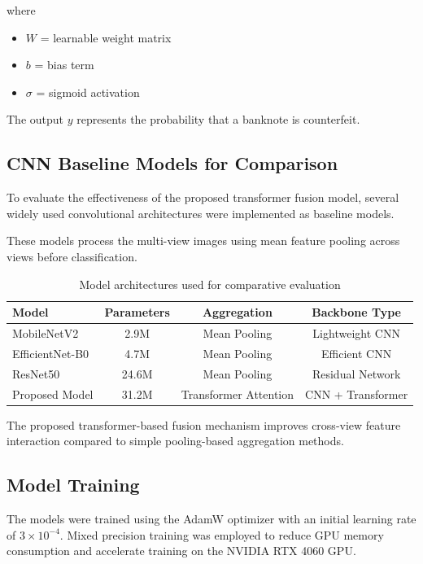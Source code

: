\documentclass[preprint,12pt,authoryear]{elsarticle}
\begin{document}
where

\begin{itemize}
\item $W$ = learnable weight matrix
\item $b$ = bias term
\item $\sigma$ = sigmoid activation
\end{itemize}

The output $y$ represents the probability that a banknote is counterfeit.


\subsection{CNN Baseline Models for Comparison}

To evaluate the effectiveness of the proposed transformer fusion model, several widely used convolutional architectures were implemented as baseline models.

These models process the multi-view images using mean feature pooling across views before classification.

\begin{table}[ht]
\centering
\caption{Model architectures used for comparative evaluation}
\begin{tabular}{lccc}
\hline
Model & Parameters & Aggregation & Backbone Type \\
\hline
MobileNetV2 & 2.9M & Mean Pooling & Lightweight CNN \\
EfficientNet-B0 & 4.7M & Mean Pooling & Efficient CNN \\
ResNet50 & 24.6M & Mean Pooling & Residual Network \\
\hline
Proposed Model & 31.2M & Transformer Attention & CNN + Transformer \\
\hline
\end{tabular}
\label{tab:cnn_models}
\end{table}

The proposed transformer-based fusion mechanism improves cross-view feature interaction compared to simple pooling-based aggregation methods.


\subsection{Model Training}

The models were trained using the AdamW optimizer with an initial learning rate of $3 \times 10^{-4}$. Mixed precision training was employed to reduce GPU memory consumption and accelerate training on the NVIDIA RTX 4060 GPU.
\end{document}
